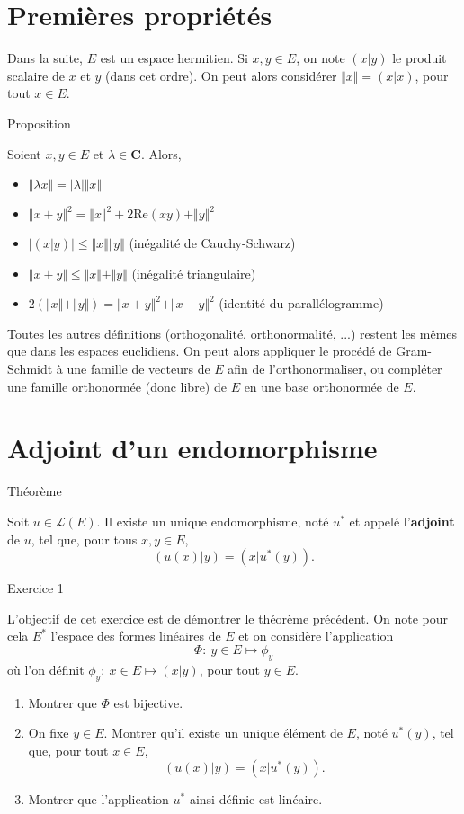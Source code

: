 \documentclass[a4paper,11pt]{article}
\newcommand{\C}{\mathbf{C}}
\renewcommand{\L}{\mathcal{L}}
\newenvironment{gbar}[1]{%
		\def\FrameCommand{{\color{#1}\vrule width 3pt }
		\colorbox{gris2}} %
		\MakeFramed{\advance\hsize -\width\FrameRestore}} %
		{\endMakeFramed}
\newenvironment{cadre}[2]{
		\begin{bclogo}[couleur = gris , barre = none , noborder = true , logo=\vspace{1em}]{
			\hspace{.14em}
			\colorbox{#1}{
				\parbox{15em}{
				\sffamily\normalsize{\color{gris}#2}
			}}
			\vspace{.2em}
		}
			\begin{gbar}{#1}
	}
	{
			\end{gbar}
		\end{bclogo}
	}
\begin{document}
\section{Premières propriétés}
Dans la suite, $E$ est un espace hermitien. Si $x,y\in E$, on note $(x\vert y)$ le produit scalaire de $x$ et $y$ (dans cet ordre). On peut alors considérer $\Vert x\Vert=(x\vert x)$, pour tout $x\in E$.

\begin{cadre}{rouge}{Proposition}
Soient $x,y\in E$ et $\lambda\in\C$. Alors,
\begin{itemize}[label={\color{rouge}•}]
\item $\Vert\lambda x\Vert=\vert\lambda\vert\Vert x\Vert$
\item $\Vert x+y\Vert^2=\Vert x\Vert^2+2\mathrm{Re}(xy)+\Vert y\Vert^2$
\item $\vert(x\vert y)\vert\leq\Vert x\Vert\Vert y\Vert$ (inégalité de Cauchy-Schwarz)
\item $\Vert x+y\Vert\leq\Vert x\Vert+\Vert y\Vert$ (inégalité triangulaire)
\item $2\left(\Vert x\Vert+\Vert y\Vert\right)=\Vert x+y\Vert^2+\Vert x-y\Vert^2$ (identité du parallélogramme)
\end{itemize}
\end{cadre}

Toutes les autres définitions (orthogonalité, orthonormalité, ...) restent les mêmes que dans les espaces euclidiens. On peut alors appliquer le procédé de Gram-Schmidt à une famille de vecteurs de $E$ afin de l'orthonormaliser, ou compléter une famille orthonormée (donc libre) de $E$ en une base orthonormée de $E$.

\section{Adjoint d'un endomorphisme}
\begin{cadre}{rouge}{Théorème}
Soit $u\in\L(E)$. Il existe un unique endomorphisme, noté $u^*$ et appelé l'{\sffamily\textbf{\color{rouge}adjoint}} de $u$, tel que, pour tous $x,y\in E$,
\[(u(x)\vert y)=(x\vert u^*(y)).\]
\end{cadre}
\begin{cadre}{jaune}{Exercice 1}
L'objectif de cet exercice est de démontrer le théorème précédent. On note pour cela $E^*$ l'espace des formes linéaires de $E$ et on considère l'application
\[\Phi:\ y\in E\mapsto\phi_y\]
où l'on définit $\phi_y:\ x\in E\mapsto (x\vert y)$, pour tout $y\in E$.
\begin{enumerate}[label=\sffamily\textbf{\color{jaune}\theenumi .}]
\item Montrer que $\Phi$ est bijective.
\item On fixe $y\in E$. Montrer qu'il existe un unique élément de $E$, noté $u^*(y)$, tel que, pour tout $x\in E$,
\[(u(x)\vert y)=(x\vert u^*(y)).\]
\item Montrer que l'application $u^*$ ainsi définie est linéaire.
\end{enumerate}
\end{cadre}
\end{document}
